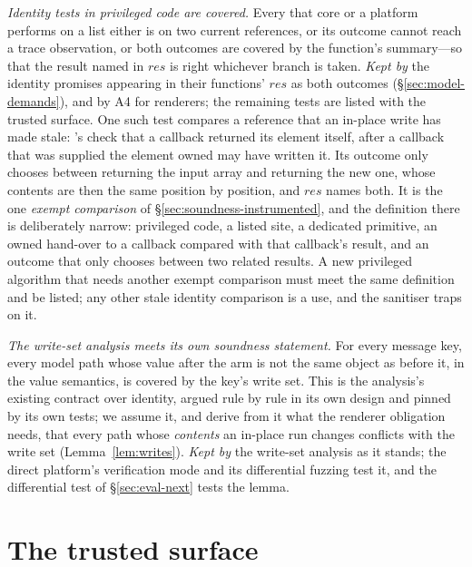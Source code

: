 \begin{description}[leftmargin=2.2em,style=sameline,font=\normalfont\bfseries]
\item[A11] \emph{Identity tests in privileged code are covered.} Every \code{===} that core or a
platform performs on a list either is on two current references, or its outcome cannot reach a trace
observation, or both outcomes are covered by the function's summary---so that the result named in
$\mathit{res}$ is right whichever branch is taken. \emph{Kept by} the identity promises appearing in
their functions' $\mathit{res}$ as both outcomes (\S\ref{sec:model-demands}), and by A4 for renderers; the
remaining tests are listed with the trusted surface. One such test compares a reference that an in-place
write has made stale: 's check that a callback returned its element itself, after a callback
that was supplied the element owned may have written it. Its outcome only chooses between returning the
input array and returning the new one, whose contents are then the same position by position, and
$\mathit{res}$ names both. It is the one \emph{exempt comparison} of \S\ref{sec:soundness-instrumented},
and the definition there is deliberately narrow: privileged code, a listed site, a dedicated primitive, an
owned hand-over to a callback compared with that callback's result, and an outcome that only chooses
between two related results. A new privileged algorithm that needs another exempt comparison must meet
the same definition and be listed; any other stale identity comparison is a use, and the sanitiser traps
on it.
\item[A12] \emph{The write-set analysis meets its own soundness statement.} For every message key, every
model path whose value after the arm is not the same object as before it, in the value semantics, is
covered by the key's write set. This is the analysis's existing contract over identity, argued rule by rule
in its own design and pinned by its own tests; we assume it, and derive from it what the renderer
obligation needs, that every path whose \emph{contents} an in-place run changes conflicts with the write
set (Lemma~\ref{lem:writes}). \emph{Kept by} the write-set analysis as it stands; the direct platform's
verification mode and its differential fuzzing test it, and the differential test of
\S\ref{sec:eval-next} tests the lemma.
\end{description}

\section{The trusted surface}
\label{sec:soundness-trusted}


